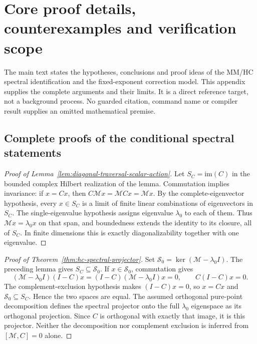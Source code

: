 \clearpage
\section{Core proof details, counterexamples and verification scope}
\label{app:core-proof-details}

The main text states the hypotheses, conclusions and proof ideas of the
MM/HC spectral identification and the fixed-exponent correction model.
This appendix supplies the complete arguments and their limits. It is a
direct reference target, not a background process. No guarded citation,
command name or compiler result supplies an omitted mathematical premise.

\subsection{Complete proofs of the conditional spectral statements}
\label{app:hc-spectral-proof}

\begin{proof}[Proof of Lemma~\ref{lem:diagonal-traversal-scalar-action}]
Let $S_C=\mathrm{im}(C)$ in the bounded complex Hilbert realization of
the lemma. Commutation implies invariance: if $x=Cx$, then
$C\mathcal Mx=\mathcal MCx=\mathcal Mx$.
By the complete-eigenvector hypothesis, every $x\in S_C$ is a limit
of finite linear combinations of eigenvectors in $S_C$. The
single-eigenvalue hypothesis assigns eigenvalue $\lambda_0$ to each
of them. Thus $\mathcal Mx=\lambda_0 x$ on that span, and boundedness
extends the identity to its closure, all of $S_C$. In finite dimensions
this is exactly diagonalizability together with one eigenvalue.
\end{proof}

\begin{proof}[Proof of Theorem~\ref{thm:hc-spectral-projector}]
Set $\mathcal S_0=\ker(\mathcal M-\lambda_0 I)$. The preceding
lemma gives $S_C\subseteq\mathcal S_0$. If $x\in\mathcal S_0$,
commutation gives
\[
 (\mathcal M-\lambda_0 I)(I-C)x
   =(I-C)(\mathcal M-\lambda_0 I)x=0,
 \qquad C(I-C)x=0.
\]
The complement-exclusion hypothesis makes $(I-C)x=0$, so $x=Cx$
and $\mathcal S_0\subseteq S_C$. Hence the two spaces are equal.
The assumed orthogonal pure-point decomposition defines the spectral
projector onto the full $\lambda_0$ eigenspace as its orthogonal
projection. Since $C$ is orthogonal with exactly that image, it is
this projector. Neither the decomposition nor complement exclusion
is inferred from $[\mathcal M,C]=0$ alone.
\end{proof}

